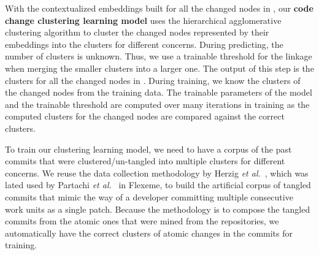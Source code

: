 

With the contextualized embeddings built for all the changed nodes in
{\mvpdg}, our {\bf code change clustering learning model} uses the
hierarchical agglomerative clustering algorithm to cluster the changed nodes
represented by their embeddings into the clusters for different
concerns. During predicting, the number of clusters is unknown. Thus,
we use a trainable threshold for the linkage when merging the smaller
clusters into a larger one. The output of this step is the clusters
for all the changed nodes in {\mvpdg}. During training, we know the
clusters of the changed nodes from the training data. The trainable
parameters of the model and the trainable threshold are computed over
many iterations in training as the computed clusters for the
changed nodes are compared against the correct clusters.

 To train our clustering
learning model, we need to have a corpus of the past commits that were
clustered/un-tangled into multiple clusters for different concerns. We
reuse the data collection methodology by Herzig {\em et
  al.}~\cite{kim-emse16}, which was lated used by Partachi {\em et
  al.}~\cite{flexeme-fse20} in Flexeme, to build the artificial corpus
of tangled commits that mimic the way of a developer committing
multiple consecutive work units as a single patch. Because the
methodology is to compose the tangled commits from the atomic ones
that were mined from the repositories, we automatically have the
correct clusters of atomic changes in the commits for training.



